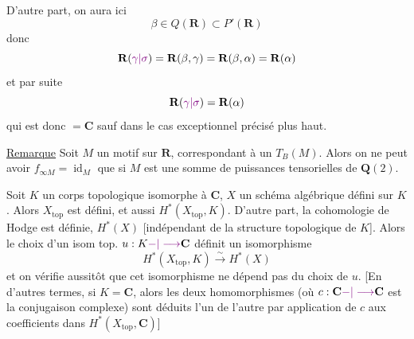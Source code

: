 D'autre part, on aura ici
\[
\beta\in Q(\mathbf R)\subset P'(\mathbf R)
\]
donc
\[
\mathbf R(\unsure{\gamma|\sigma})=\mathbf R(\beta,\gamma)=\mathbf R(\beta,\alpha)=\mathbf R(\alpha)
\]
et par suite
\[
\mathbf R(\unsure{\gamma|\sigma})=\mathbf R(\alpha)
\]
qui est donc $=\mathbf C$ sauf dans le cas exceptionnel précisé plus haut.

\uline{Remarque} Soit $M$ un motif sur $\mathbf R$, correspondant à un   $T_B(M)$. Alors on ne peut avoir $f_{\infty M}=\operatorname{id}_M$ que si $M$ est une somme de puissances tensorielles de $\mathbf Q(2)$.




Soit $K$ un corps topologique isomorphe à $\mathbf C$, $X$ un schéma algébrique défini sur $K$. Alors $X_{\mathrm{top}}$ est défini, et aussi $H^*(X_{\mathrm{top}},K)$. D'autre part,  la cohomologie de Hodge est définie,  $H^*(X)$ [indépendant de la structure topologique de $K$]. Alors le choix d'un isom top. $u:K\unsure{-|\longrightarrow}\mathbf C$ définit un isomorphisme
\[
H^*(X_{\mathrm{top}},K)\xrightarrow{\sim}H^*(X)
\]
et on vérifie aussitôt que cet isomorphisme ne dépend pas du choix de $u$. [En d'autres termes, si $K=\mathbf C$, alors les deux homomorphismes
(où $c:\mathbf C\unsure{-|\longrightarrow}\mathbf C$ est la conjugaison complexe) sont  déduits l'un de l'autre par application de $c$ aux coefficients dans $H^*(X_{\mathrm{top}},\mathbf C)$]

